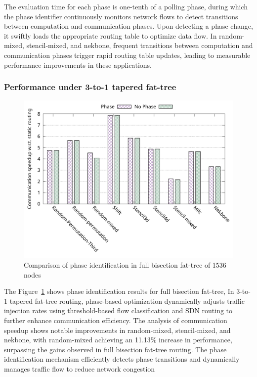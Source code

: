 The evaluation time for each phase is one-tenth of a polling phase, during which the phase identifier continuously monitors network flows to detect transitions between computation and communication phases. Upon detecting a phase change, it swiftly loads the appropriate routing table to optimize data flow. In random-mixed, stencil-mixed, and nekbone, frequent transitions between computation and communication phases trigger rapid routing table updates, leading to measurable performance improvements in these applications.


\subsubsection{Performance under 3-to-1 tapered fat-tree}
\begin{figure}[h]
  \centering
  \includegraphics[width=\columnwidth]{./figs_4/phase_taper.pdf}
  \caption{Comparison of phase identification in full bisection fat-tree of 1536 nodes}
  \label{fig:phase_taper}
\end{figure}
The Figure~\ref{fig:phase_taper} shows phase identification results for full bisection fat-tree,
In 3-to-1 tapered fat-tree routing, phase-based optimization dynamically adjusts traffic injection rates using threshold-based flow classification and SDN routing to further enhance communication efficiency. The analysis of communication speedup shows notable improvements in random-mixed, stencil-mixed, and nekbone, with random-mixed achieving an 11.13\% increase in performance, surpassing the gains observed in full bisection fat-tree routing. The phase identification mechanism efficiently detects phase transitions and dynamically manages traffic flow to reduce network congestion

